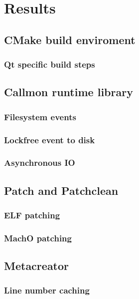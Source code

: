 \section{Results}

\subsection{CMake build enviroment} 
\subsubsection{Qt specific build steps}

\subsection{Callmon runtime library} 
\subsubsection{Filesystem events} 
\subsubsection{Lockfree event to disk} 
\subsubsection{Asynchronous IO}

\subsection{Patch and Patchclean} 
\subsubsection{ELF patching} 
\subsubsection{MachO patching}

\subsection{Metacreator} 
\subsubsection{Line number caching} 
